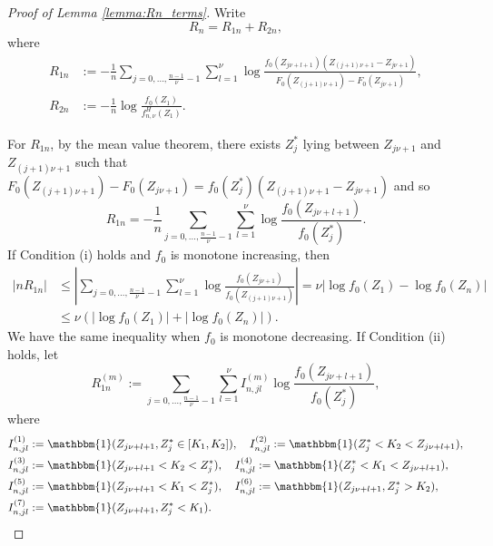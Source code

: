 \documentclass[10pt,a4paper]{amsart}
\begin{document}
\begin{proof}[Proof of Lemma \ref{lemma:Rn_terms}]
	Write
\begin{equation*}
	R_n = R_{1n} + R_{2n},
\end{equation*}
where
\begin{align*}
R_{1n} &:=	- \frac{1}{n} \sum_{j=0,\ldots,\frac{n-1}{\nu} - 1} 
	\sum^\nu_{l=1} \log \frac{f_0(Z_{j\nu+l+1})(Z_{(j+1)\nu+1} - Z_{j\nu+1})}{F_0(Z_{(j+1)\nu+1}) - F_0(Z_{j\nu+1})},\\
	R_{2n} &:= -\frac{1}{n}\log \frac{f_0(Z_1)}{f^H_{n,\nu}(Z_1)}.
\end{align*}

%
For $R_{1n}$, by the mean value theorem, there exists $Z^*_j$ lying between $Z_{j\nu+1}$ and $Z_{(j+1)\nu+1}$ such that $F_0(Z_{(j+1)\nu+1}) - F_0(Z_{j\nu+1}) = f_0(Z^*_j)(Z_{(j+1)\nu+1} - Z_{j\nu+1})$ and so
	\begin{equation*}
R_{1n}  = -\frac{1}{n}\sum_{j=0,\ldots, \frac{n-1}{\nu}-1} \sum^\nu_{l=1} \log \frac{f_0(Z_{j\nu+l+1})}{f_0(Z^*_j)}.
	\end{equation*}
 If Condition (i) holds and $f_0$ is monotone increasing, then
\begin{align}
    |n R_{1n}| & \leq \left|  \sum_{j=0,\ldots, \frac{n-1}{\nu}-1} \sum^\nu_{l=1} \log \frac{f_0(Z_{j\nu+1})}{f_0(Z_{(j+1)\nu+1})}\right| =\nu \left| \log f_0(Z_1) - \log f_0(Z_n)\right|\nonumber \\
    & \leq \nu (|\log f_0(Z_1)| + |\log f_0(Z_n)|). \label{eqnR_1n1}
\end{align}
We have the same inequality when $f_0$ is monotone decreasing.
If Condition (ii) holds, 
let 
\begin{equation*}
R^{(m)}_{1n} := \sum_{j=0,\ldots, \frac{n-1}{\nu}-1} \sum^\nu_{l=1} I^{(m)}_{n,jl} \log \frac{f_0(Z_{j\nu+l+1})}{f_0(Z^*_j)},
\end{equation*}
where 
\begin{align*}
    I^{(1)}_{n,jl} &:= \mathbbm{1}(Z_{j\nu+l+1}, Z^*_j \in [K_1,K_2]), \quad 
    I^{(2)}_{n,jl} := \mathbbm{1}( Z^*_j < K_2 < Z_{j\nu+l+1}),\\
    I^{(3)}_{n,jl} &:= \mathbbm{1}(  Z_{j\nu+l+1} < K_2 < Z^*_j), \quad 
    I^{(4)}_{n,jl}:=\mathbbm{1}( Z^*_j < K_1 < Z_{j\nu+l+1}),\\
    I^{(5)}_{n,jl} &:= \mathbbm{1}(  Z_{j\nu+l+1} < K_1 < Z^*_j), \quad 
    I^{(6)}_{n,jl} :=\mathbbm{1}(  Z_{j\nu+l+1}, Z^*_j > K_2),\\
    I^{(7)}_{n,jl} &:=\mathbbm{1}(  Z_{j\nu+l+1}, Z^*_j < K_1).
\end{align*}

\end{proof}
\end{document}
